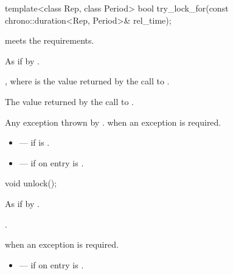 %
\begin{itemdecl}
template<class Rep, class Period>
  bool try_lock_for(const chrono::duration<Rep, Period>& rel_time);
\end{itemdecl}

\begin{itemdescr}
\pnum
\expects
{} meets the 
requirements.

\pnum
\effects
As if by .

\pnum
\ensures
{}, where  is the value returned by the call to .

\pnum
\returns
The value returned by the call to .

\pnum
\throws
Any exception thrown by .  when an exception is required.

\pnum
\errors
\begin{itemize}
\item {} --- if  is .
\item {} --- if on entry  is
.
\end{itemize}
\end{itemdescr}

%
\begin{itemdecl}
void unlock();
\end{itemdecl}

\begin{itemdescr}
\pnum
\effects
As if by .

\pnum
\ensures
{}.

\pnum
\throws
{} when an exception is required.

\pnum
\errors
\begin{itemize}
\item {} --- if on entry  is
.
\end{itemize}
\end{itemdescr}

